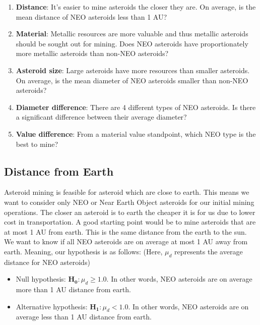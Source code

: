 \documentclass[
]{article}
\begin{document}
\begin{enumerate}
\def\labelenumi{\arabic{enumi}.}
\item
  \textbf{Distance}: It's easier to mine asteroids the closer they are.
  On average, is the mean distance of NEO asteroids less than 1 AU?
\item
  \textbf{Material}: Metallic resources are more valuable and thus
  metallic asteroids should be sought out for mining. Does NEO asteroids
  have proportionately more metallic asteroids than non-NEO asteroids?
\item
  \textbf{Asteroid size}: Large asteroids have more resources than
  smaller asteroids. On average, is the mean diameter of NEO asteroids
  smaller than non-NEO asteroids?
\item
  \textbf{Diameter difference}: There are 4 different types of NEO
  asteroids. Is there a significant difference between their average
  diameter?
\item
  \textbf{Value difference}: From a material value standpoint, which NEO
  type is the best to mine?
\end{enumerate}

\hypertarget{distance-from-earth-1}{%
\subsection{Distance from Earth}\label{distance-from-earth-1}}

Asteroid mining is feasible for asteroid which are close to earth. This
means we want to consider only NEO or Near Earth Object asteroids for
our initial mining operations. The closer an asteroid is to earth the
cheaper it is for us due to lower cost in transportation. A good
starting point would be to mine asteroids that are at most 1 AU from
earth. This is the same distance from the earth to the sun. We want to
know if all NEO asteroids are on average at most 1 AU away from earth.
Meaning, our hypothesis is as follows: (Here, \(\mu_d\) represents the
average distance for NEO asteroids)

\begin{itemize}
\item
  Null hypothesis: \(\mathbf{H_0}: \mu_d \ge 1.0\). In other words, NEO
  asteroids are on average more than 1 AU distance from earth.
\item
  Alternative hypothesis: \(\mathbf{H_1}: \mu_d < 1.0\). In other words,
  NEO asteroids are on average less than 1 AU distance from earth.
\end{itemize}
\end{document}
